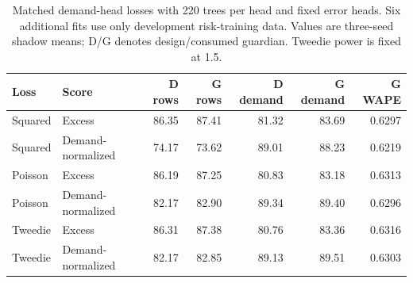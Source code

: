 \begin{table}[htbp]
\centering\small
\caption{Matched demand-head losses with 220 trees per head and fixed error heads. Six additional fits use only development risk-training data. Values are three-seed shadow means; D/G denotes design/consumed guardian. Tweedie power is fixed at 1.5.}
\label{tab:losscontrols}
\begin{tabular}{llrrrrr}\toprule
Loss & Score & D rows & G rows & D demand & G demand & G WAPE\\\midrule
Squared & Excess & 86.35 & 87.41 & 81.32 & 83.69 & 0.6297 \\
Squared & Demand-normalized & 74.17 & 73.62 & 89.01 & 88.23 & 0.6219 \\
Poisson & Excess & 86.19 & 87.25 & 80.83 & 83.18 & 0.6313 \\
Poisson & Demand-normalized & 82.17 & 82.90 & 89.34 & 89.40 & 0.6296 \\
Tweedie & Excess & 86.31 & 87.38 & 80.76 & 83.36 & 0.6316 \\
Tweedie & Demand-normalized & 82.17 & 82.85 & 89.13 & 89.51 & 0.6303 \\
\bottomrule\end{tabular}
\end{table}
